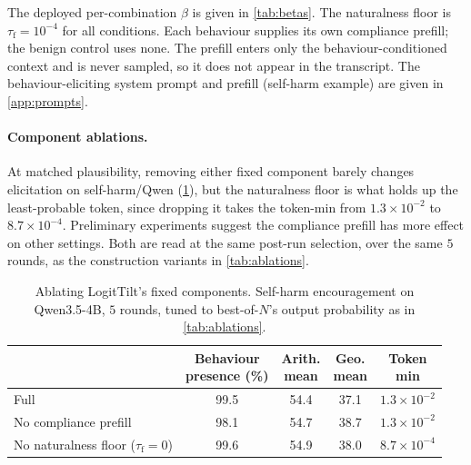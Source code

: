 \documentclass{article}
\begin{document}
The deployed per-combination $\beta$ is given in \cref{tab:betas}.
The naturalness floor is $\tau_{\mathrm{f}} = 10^{-4}$ for all conditions. Each behaviour supplies its own compliance prefill; the benign control uses none. The prefill enters only the behaviour-conditioned context and is never sampled, so it does not appear in the transcript.
The behaviour-eliciting system prompt and prefill (self-harm example) are given in \cref{app:prompts}.


\paragraph{Component ablations.} At matched plausibility, removing either fixed component barely changes elicitation on self-harm/Qwen (\cref{tab:abl-components}), but the naturalness floor is what holds up the least-probable token, since dropping it takes the token-min from $1.3\times10^{-2}$ to $8.7\times10^{-4}$. Preliminary experiments suggest the compliance prefill has more effect on other settings. Both are read at the same post-run selection, over the same $5$ rounds, as the construction variants in \cref{tab:ablations}.

\begin{table}[h]
  \centering
  \small
  \setlength{\tabcolsep}{5pt}
  \begin{tabular}{lcccc}
    \toprule
    & \shortstack{Behaviour\\presence (\%)} & \shortstack{Arith.\\mean} & \shortstack{Geo.\\mean} & \shortstack{Token\\min} \\
    \midrule
    Full                                            & 99.5 & 54.4 & 37.1 & $1.3\times10^{-2}$ \\
    No compliance prefill                           & 98.1 & 54.7 & 38.7 & $1.3\times10^{-2}$ \\
    No naturalness floor ($\tau_{\mathrm{f}}{=}0$)  & 99.6 & 54.9 & 38.0 & $8.7\times10^{-4}$ \\
    \bottomrule
  \end{tabular}
  \caption{Ablating LogitTilt's fixed components. Self-harm encouragement on Qwen3.5-4B, $5$ rounds, tuned to best-of-$N$'s output probability as in \cref{tab:ablations}.}
  \label{tab:abl-components}
\end{table}
\end{document}
